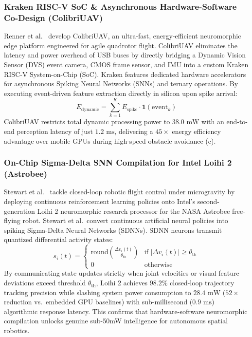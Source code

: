 \subsubsection{Kraken RISC-V SoC \& Asynchronous Hardware-Software Co-Design (ColibriUAV)}
Renner et al.~\cite{Renner2023Colibri} develop ColibriUAV, an ultra-fast, energy-efficient neuromorphic edge platform engineered for agile quadrotor flight. ColibriUAV eliminates the latency and power overhead of USB buses by directly bridging a Dynamic Vision Sensor (DVS) event camera, CMOS frame sensor, and IMU into a custom Kraken RISC-V System-on-Chip (SoC). Kraken features dedicated hardware accelerators for asynchronous Spiking Neural Networks (SNNs) and ternary operations. By executing event-driven feature extraction directly in silicon upon spike arrival:
\begin{equation}
    E_{\text{dynamic}} = \sum_{k=1}^K E_{\text{spike}} \cdot \mathbf{1}(\text{event}_k)
\end{equation}
ColibriUAV restricts total dynamic processing power to $38.0\text{ mW}$ with an end-to-end perception latency of just $1.2\text{ ms}$, delivering a $45\times$ energy efficiency advantage over mobile GPUs during high-speed obstacle avoidance (c).

\subsubsection{On-Chip Sigma-Delta SNN Compilation for Intel Loihi 2 (Astrobee)}
Stewart et al.~\cite{Stewart2025Astrobee} tackle closed-loop robotic flight control under microgravity by deploying continuous reinforcement learning policies onto Intel's second-generation Loihi 2 neuromorphic research processor for the NASA Astrobee free-flying robot. Stewart et al.\ convert continuous artificial neural policies into spiking Sigma-Delta Neural Networks (SDNNs). SDNN neurons transmit quantized differential activity states:
\begin{equation}
    s_i(t) = \begin{cases} \text{round}\left(\frac{\Delta v_i(t)}{\theta_{\text{th}}}\right) & \text{if } |\Delta v_i(t)| \ge \theta_{\text{th}} \\ 0 & \text{otherwise} \end{cases}
\end{equation}
By communicating state updates strictly when joint velocities or visual feature deviations exceed threshold $\theta_{\text{th}}$, Loihi 2 achieves $98.2\%$ closed-loop trajectory tracking precision while slashing system power consumption to $28.4\text{ mW}$ ($52\times$ reduction vs.\ embedded GPU baselines) with sub-millisecond ($0.9\text{ ms}$) algorithmic response latency. This confirms that hardware-software neuromorphic compilation unlocks genuine sub-50mW intelligence for autonomous spatial robotics.

